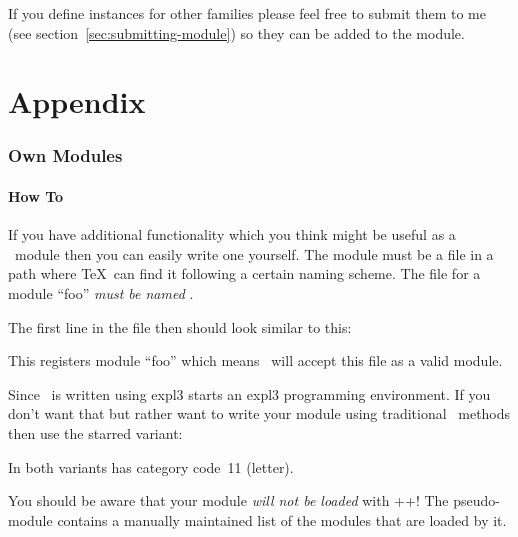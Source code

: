 \documentclass[load-preamble+]{cnltx-doc}
\def\chemmodule*#1{\textquotedblleft#1\textquotedblright}%
\begin{document}
If you define instances for other families please feel free to submit them to
me (see section~\vref{sec:submitting-module}) so they can be added to the
 module.

\appendix
\part{Appendix}
\section{Own Modules}\label{sec:own-modules}
\subsection{How To}

If you have additional functionality which you think might be useful as a
\chemmacros\ module then you can easily write one yourself.  The module must
be a file in a path where \TeX\ can find it following a certain naming
scheme.  The file for a module \chemmodule*{foo} \emph{must be named}
.

The first line in the file then should look similar to this:
\begin{sourcecode}
\end{sourcecode}
This registers module \chemmodule*{foo} which means \chemmacros\ will accept
this file as a valid module.

Since \chemmacros\ is written using expl3  starts an expl3
programming environment.  If you don't want that but rather want to write your
module using traditional \LaTeXe\ methods then use the starred variant:
\begin{sourcecode}
\end{sourcecode}
In both variants  has category code~11 (letter).

You should be aware that your module \emph{will not be loaded} with
\verbcode++! The pseudo-module  contains a
manually maintained list of the modules that are loaded by it.
\end{document}
